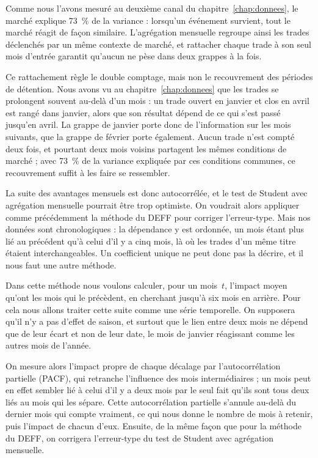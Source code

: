 Comme nous l'avons mesuré au deuxième canal du chapitre~\ref{chap:donnees}, le
marché explique 73~\% de la variance : lorsqu'un événement survient, tout le
marché réagit de façon similaire. L'agrégation mensuelle regroupe ainsi les
trades déclenchés par un même contexte de marché, et rattacher chaque trade à
son seul mois d'entrée garantit qu'aucun ne pèse dans deux grappes à la fois.

Ce rattachement règle le double comptage, mais non le recouvrement des périodes
de détention. Nous avons vu au chapitre~\ref{chap:donnees} que les trades se
prolongent souvent au-delà d'un mois : un trade ouvert en janvier et clos en
avril est rangé dans janvier, alors que son résultat dépend de ce qui s'est
passé jusqu'en avril. La grappe de janvier porte donc de l'information sur les
mois suivants, que la grappe de février porte également. Aucun trade n'est
compté deux fois, et pourtant deux mois voisins partagent les mêmes conditions
de marché ; avec 73~\% de la variance expliquée par ces conditions communes, ce
recouvrement suffit à les faire se ressembler.

La suite des avantages mensuels est donc autocorrélée, et le test de Student
avec agrégation mensuelle pourrait être trop optimiste.
On voudrait alors appliquer comme précédemment la méthode du DEFF pour corriger
l'erreur-type. Mais nos données sont chronologiques : la dépendance y est
ordonnée, un mois étant plus lié au précédent qu'à celui d'il y a cinq mois,
là où les trades d'un même titre étaient interchangeables. Un coefficient
unique ne peut donc pas la décrire, et il nous faut une autre méthode.

Dans cette méthode nous voulons calculer, pour un mois~$t$, l'impact moyen
qu'ont les mois qui le précèdent, en cherchant jusqu'à six mois en arrière.
Pour cela nous allons traiter cette suite comme une série temporelle. On
supposera qu'il n'y a pas d'effet de saison, et surtout que le lien entre deux
mois ne dépend que de leur écart et non de leur date, le mois de janvier
réagissant comme les autres mois de l'année.

On mesure alors l'impact propre de chaque décalage par l'autocorrélation
partielle (PACF), qui retranche l'influence des mois intermédiaires ; un
mois peut en effet sembler lié à celui d'il y a deux mois par le seul fait
qu'ils sont tous deux liés au mois qui les sépare. Cette autocorrélation
partielle s'annule au-delà du dernier mois qui compte vraiment, ce qui nous
donne le nombre de mois à retenir, puis l'impact de chacun d'eux. Ensuite, de
la même façon que pour la méthode du DEFF, on corrigera l'erreur-type du test
de Student avec agrégation mensuelle.

